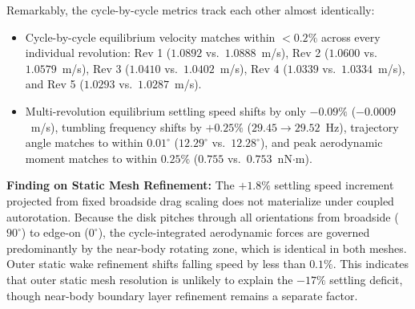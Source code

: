 \documentclass[11pt,a4paper]{article}
\begin{document}
Remarkably, the cycle-by-cycle metrics track each other almost identically:
\begin{itemize}
    \item Cycle-by-cycle equilibrium velocity matches within $< 0.2\%$ across every individual revolution: Rev 1 ($1.0892$ vs.\ $1.0888$~m/s), Rev 2 ($1.0600$ vs.\ $1.0579$~m/s), Rev 3 ($1.0410$ vs.\ $1.0402$~m/s), Rev 4 ($1.0339$ vs.\ $1.0334$~m/s), and Rev 5 ($1.0293$ vs.\ $1.0287$~m/s).
    \item Multi-revolution equilibrium settling speed shifts by only $\mathbf{-0.09\%}$ ($-0.0009$~m/s), tumbling frequency shifts by $+0.25\%$ ($29.45 \to 29.52$~Hz), trajectory angle matches to within $0.01^\circ$ ($12.29^\circ$ vs.\ $12.28^\circ$), and peak aerodynamic moment matches to within $0.25\%$ ($0.755$ vs.\ $0.753$~nN$\cdot$m).
\end{itemize}
\textbf{Finding on Static Mesh Refinement:} The $+1.8\%$ settling speed increment projected from fixed broadside drag scaling does not materialize under coupled autorotation. Because the disk pitches through all orientations from broadside ($90^\circ$) to edge-on ($0^\circ$), the cycle-integrated aerodynamic forces are governed predominantly by the near-body rotating zone, which is identical in both meshes. Outer static wake refinement shifts falling speed by less than $0.1\%$. This indicates that outer static mesh resolution is unlikely to explain the $-17\%$ settling deficit, though near-body boundary layer refinement remains a separate factor.
\end{document}
